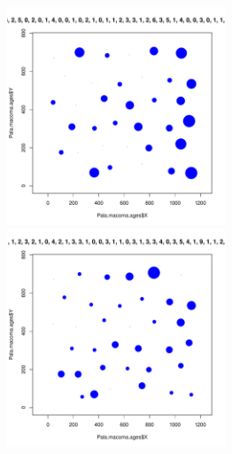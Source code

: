 \documentclass[12pt, a4paper]{disser}
\begin{document}
\begin{figure}[h]
	\begin{minipage}[b]{.46\linewidth}
	\begin{center}
		\includegraphics[width=65mm]{./Pala_macoma_age_bubb_N5_.pdf}
	\end{center}
	\end{minipage}
%
	\hfil %
%
	\begin{minipage}[b]{.46\linewidth}
	\begin{center}
		\includegraphics[width=65mm]{./Pala_macoma_age_bubb_N6_.pdf}
	\end{center}
	\end{minipage}



	\end{figure}
\end{document}
